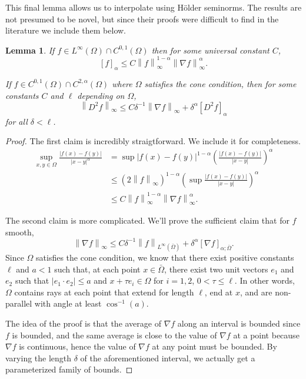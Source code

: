 \documentclass[11pt]{amsart}
\newtheorem{lemma}[theorem]{Lemma}
\theoremstyle{remark}
\theoremstyle{definition}
\newcommand{\norm}[1]{\left\lVert#1\right\rVert}
\newcommand{\paren}[1]{\left( #1 \right)}
\newcommand{\bracket}[1]{\left[ #1 \right]}
\newcommand{\grad}{\nabla}
\newcommand{\n}{^{-1}}
\begin{document}
This final lemma allows us to interpolate using H\"{o}lder seminorms.  The results are not presumed to be novel, but since their proofs were difficult to find in the literature we include them below.  
\begin{lemma} \label{thm:Holder interpolation}
If $f \in L^\infty(\Omega) \cap C^{0,1}(\Omega)$ then for some universal constant $C$,
\[ \bracket{f}_\alpha \leq C \norm{f}_\infty^{1-\alpha} \norm{\grad f}_\infty^\alpha. \]

If $f \in C^{0,1}(\Omega) \cap C^{2,\alpha}(\Omega)$ where $\Omega$ satisfies the cone condition, then for some constants $C$ and $\ell$ depending on $\Omega$,
\[ \norm{D^2 f}_\infty \leq C \delta\n \norm{\grad f}_\infty  + \delta^\alpha \bracket{D^2 f}_\alpha\]
for all $\delta < \ell$.  
\end{lemma}
\begin{proof}
The first claim is incredibly straigtforward.  We include it for completeness.  
\begin{align*} 
\sup_{x,y \in \Omega} \frac{|f(x)-f(y)|}{|x-y|^\alpha} &= \sup |f(x)-f(y)|^{1-\alpha} \paren{\frac{|f(x)-f(y)|}{|x-y|}}^\alpha 
\\ &\leq \paren{2 \norm{f}_\infty}^{1-\alpha} \paren{ \sup \frac{|f(x)-f(y)|}{|x-y|} }^\alpha
\\ &\leq C \norm{f}_\infty^{1-\alpha} \norm{\grad f}_\infty^\alpha.
\end{align*}

The second claim is more complicated.  We'll prove the sufficient claim that for $f$ smooth,
\[ \norm{\grad f}_\infty \leq C \delta\n \norm{f}_{L^\infty(\bar{\Omega})} + \delta^\alpha \bracket{\grad f}_{\alpha;\bar{\Omega}}.\]
Since $\Omega$ satisfies the cone condition, we know that there exist positive constants $\ell$ and $a<1$ such that, at each point $x \in \bar{\Omega}$, there exist two unit vectors $e_1$ and $e_2$ such that $|e_1\cdot e_2| \leq a$ and $x + \tau e_i \in \Omega$ for $i=1,2$, $0 < \tau \leq \ell$.  In other words, $\Omega$ contains rays at each point that extend for length $\ell$, end at $x$, and are non-parallel with angle at least $\cos\n(a)$.  

The idea of the proof is that the average of $\grad f$ along an interval is bounded since $f$ is bounded, and the same average is close to the value of $\grad f$ at a point because $\grad f$ is continuous, hence the value of $\grad f$ at any point must be bounded.  By varying the length $\delta$ of the aforementioned interval, we actually get a parameterized family of bounds.  


\end{proof}
\end{document}
